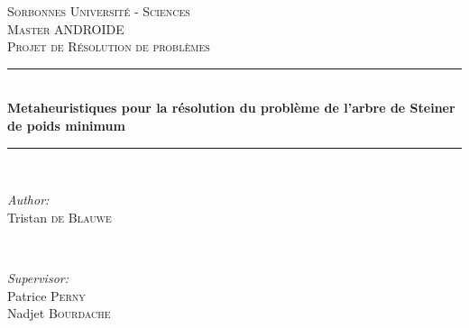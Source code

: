 \begin{titlepage}

\newcommand{\HRule}{\rule{\linewidth}{0.5mm}} %

\center %
 

\textsc{\LARGE Sorbonnes Université - Sciences}\\[1.5cm] %
\textsc{\Large Master ANDROIDE}\\[0.5cm] %
\textsc{\large Projet de Résolution de problèmes}\\[0.5cm] %


\HRule \\[0.4cm]
{ \large \bfseries Metaheuristiques pour la résolution du problème de l'arbre de Steiner de poids minimum}\\[0.4cm] %
\HRule \\[1.5cm]
 

\begin{minipage}{0.4\textwidth}
\begin{flushleft} \large
\emph{Author:}\\
Tristan \textsc{de Blauwe} %
\end{flushleft}
\end{minipage}
~
\begin{minipage}{0.4\textwidth}
\begin{flushright} \large
\emph{Supervisor:} \\
Patrice \textsc{Perny} \\%
Nadjet \textsc{Bourdache}%
\end{flushright}
\end{minipage}\\[2cm]


\end{titlepage}
